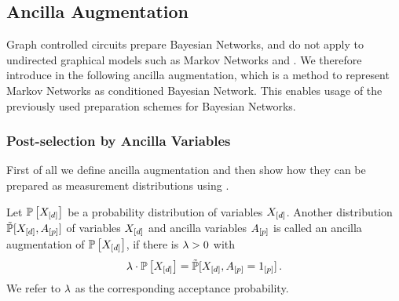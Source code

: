 \subsection{Ancilla Augmentation}


Graph controlled circuits prepare Bayesian Networks, and do not apply to undirected graphical models such as Markov Networks and \ComputationActivationNetworks{}.
We therefore introduce in the following ancilla augmentation, which is a method to represent Markov Networks as conditioned Bayesian Network.
This enables usage of the previously used preparation schemes for Bayesian Networks.

\subsubsection{Post-selection by Ancilla Variables}

First of all we define ancilla augmentation and then show how they can be prepared as measurement distributions using \activationCircuits{}.

\begin{definition}
    Let $\mathbb{P}\left[X_{[d]}\right]$ be a probability distribution of variables $X_{[d]}$.
    Another distribution $\tilde{\mathbb{P}}[X_{[d]},A_{[p]}]$ of variables $X_{[d]}$ and ancilla variables $A_{[p]}$ is called an ancilla augmentation of $\mathbb{P}\left[X_{[d]}\right]$, if there is $\lambda>0$ with
    \begin{align*}
        \lambda \cdot \mathbb{P}\left[X_{[d]}\right]
        = \tilde{\mathbb{P}}[X_{[d]},A_{[p]}=1_{[p]}] \, .
    \end{align*}
    We refer to $\lambda$ as the corresponding acceptance probability.
\end{definition}

%

